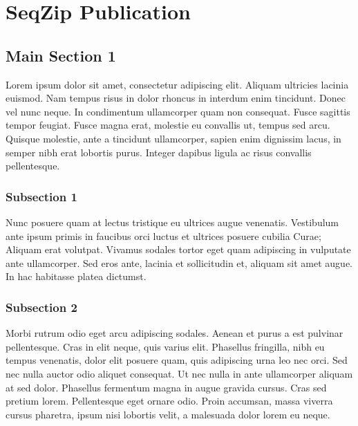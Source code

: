 
\chapter{SeqZip Publication} %

\label{Chapter3} %



\section{Main Section 1}

Lorem ipsum dolor sit amet, consectetur adipiscing elit. Aliquam ultricies lacinia euismod. Nam tempus risus in dolor rhoncus in interdum enim tincidunt. Donec vel nunc neque. In condimentum ullamcorper quam non consequat. Fusce sagittis tempor feugiat. Fusce magna erat, molestie eu convallis ut, tempus sed arcu. Quisque molestie, ante a tincidunt ullamcorper, sapien enim dignissim lacus, in semper nibh erat lobortis purus. Integer dapibus ligula ac risus convallis pellentesque.

\subsection{Subsection 1}

Nunc posuere quam at lectus tristique eu ultrices augue venenatis. Vestibulum ante ipsum primis in faucibus orci luctus et ultrices posuere cubilia Curae; Aliquam erat volutpat. Vivamus sodales tortor eget quam adipiscing in vulputate ante ullamcorper. Sed eros ante, lacinia et sollicitudin et, aliquam sit amet augue. In hac habitasse platea dictumst.


\subsection{Subsection 2}
Morbi rutrum odio eget arcu adipiscing sodales. Aenean et purus a est pulvinar pellentesque. Cras in elit neque, quis varius elit. Phasellus fringilla, nibh eu tempus venenatis, dolor elit posuere quam, quis adipiscing urna leo nec orci. Sed nec nulla auctor odio aliquet consequat. Ut nec nulla in ante ullamcorper aliquam at sed dolor. Phasellus fermentum magna in augue gravida cursus. Cras sed pretium lorem. Pellentesque eget ornare odio. Proin accumsan, massa viverra cursus pharetra, ipsum nisi lobortis velit, a malesuada dolor lorem eu neque.

